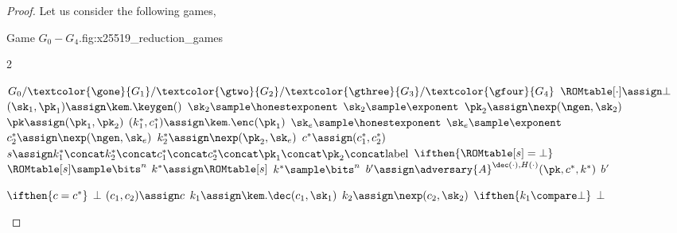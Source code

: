 \begin{proof}
    Let us consider the following games,

    \begin{gamefigure}{Game $G_0 - G_4$.}{fig:x25519_reduction_games}
        \begin{games}{2}
            \begin{gameenv}{\game $G_0 / \textcolor{\gone}{G_1} / \textcolor{\gtwo}{G_2} / \textcolor{\gthree}{G_3} / \textcolor{\gfour}{G_4}$}
                \State $\ROMtable[\cdot] \assign \bot$
                \State $(\sk_1, \pk_1) \assign \kem.\keygen()$
                \State $\sk_2 \sample \honestexponent$
                \BeginBox[draw=\gone]
                \State $\sk_2 \sample \exponent$
                \EndBox
                \State $\pk_2 \assign \nexp(\ngen, \sk_2)$
                \State $\pk \assign (\pk_1, \pk_2)$
                \State $(k^*_1, c^*_1) \assign \kem.\enc(\pk_1)$
                \State $\sk_e \sample \honestexponent$
                \BeginBox[draw=\gone]
                \State $\sk_e \sample \exponent$
                \EndBox
                \State $c^*_2 \assign \nexp(\ngen, \sk_e)$
                \State $k^*_2 \assign \nexp(\pk_2, \sk_e)$
                \State $c^* \assign (c^*_1, c^*_2)$
                \State $s \assign k^*_1 \concat k^*_2 \concat c^*_1 \concat c^*_2 \concat \pk_1 \concat \pk_2 \concat \text{label}$
                \State $\ifthen{\ROMtable[s] = \bot}$
                    \State \quad $\ROMtable[s] \sample \bits^{n}$
                    \State $k^* \assign \ROMtable[s]$
                    \BeginBox[draw=\gfour]
                    \State $k^* \sample \bits^{n}$
                    \EndBox
                    \State $b' \assign \adversary{A}^{\dec(\cdot), H(\cdot)}(\pk, c^*, k^*)$
                    \State \Return $b'$
                \end{gameenv}
                \gamebreak
                \begin{gameenv}{\oracledec}
                    \State $\ifthen{c = c^*}$
                        \State \quad \Return $\bot$
                        \State $(c_1, c_2) \assign c$
                        \State $k_1 \assign \kem.\dec(c_1, \sk_1)$
                        \State $k_2 \assign \nexp(c_2, \sk_2)$
                        \State $\ifthen{k_1 \compare \bot}$
                            \State \quad \Return $\bot$
                            \BeginBox[draw=\gthree]

\end{gameenv}
\end{games}
\end{gamefigure}
\end{proof}

